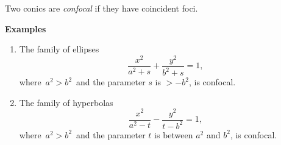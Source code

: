 \documentclass[12pt]{article}
\begin{document}
Two conics are {\em confocal} if they have coincident foci. 

\textbf{Examples}
\begin{enumerate}
\item The family of ellipses
$$\frac{x^2}{a^2+s}+\frac{y^2}{b^2+s} = 1,$$
where \,$a^2 > b^2$\, and the parameter $s$ is  $> -b^2$, is confocal.
\item The family of hyperbolas
$$\frac{x^2}{a^2-t}-\frac{y^2}{t-b^2} = 1,$$
where \,$a^2 > b^2$\, and the parameter $t$ is between $a^2$ and $b^2$, is confocal.
\end{enumerate}
\end{document}
